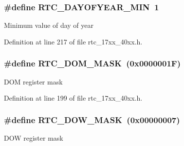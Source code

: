 \subsubsection[{\texorpdfstring{R\+T\+C\+\_\+\+D\+A\+Y\+O\+F\+Y\+E\+A\+R\+\_\+\+M\+IN}{RTC_DAYOFYEAR_MIN}}]{\setlength{\rightskip}{0pt plus 5cm}\#define R\+T\+C\+\_\+\+D\+A\+Y\+O\+F\+Y\+E\+A\+R\+\_\+\+M\+IN~1}\hypertarget{group__RTC__17XX__40XX_ga132dcf308a59affe54749f4f11cd22a6}{}\label{group__RTC__17XX__40XX_ga132dcf308a59affe54749f4f11cd22a6}
Minimum value of day of year 

Definition at line 217 of file rtc\+\_\+17xx\+\_\+40xx.\+h.

\subsubsection[{\texorpdfstring{R\+T\+C\+\_\+\+D\+O\+M\+\_\+\+M\+A\+SK}{RTC_DOM_MASK}}]{\setlength{\rightskip}{0pt plus 5cm}\#define R\+T\+C\+\_\+\+D\+O\+M\+\_\+\+M\+A\+SK~(0x0000001\+F)}\hypertarget{group__RTC__17XX__40XX_ga7c4ea655a8ccf43870c672c1058a133e}{}\label{group__RTC__17XX__40XX_ga7c4ea655a8ccf43870c672c1058a133e}
D\+OM register mask 

Definition at line 199 of file rtc\+\_\+17xx\+\_\+40xx.\+h.

\subsubsection[{\texorpdfstring{R\+T\+C\+\_\+\+D\+O\+W\+\_\+\+M\+A\+SK}{RTC_DOW_MASK}}]{\setlength{\rightskip}{0pt plus 5cm}\#define R\+T\+C\+\_\+\+D\+O\+W\+\_\+\+M\+A\+SK~(0x00000007)}\hypertarget{group__RTC__17XX__40XX_ga6564edf565a643214a54ffac364c69ca}{}\label{group__RTC__17XX__40XX_ga6564edf565a643214a54ffac364c69ca}
D\+OW register mask 

